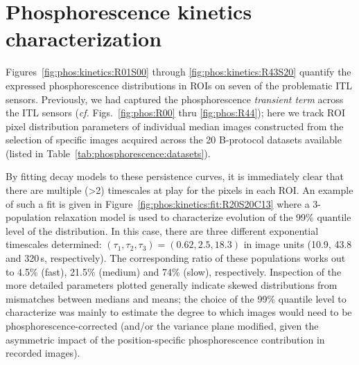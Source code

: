 \section{Phosphorescence kinetics characterization}
\label{appendix:phos:kinetics}

Figures~\ref{fig:phos:kinetics:R01S00} through \ref{fig:phos:kinetics:R43S20} quantify the expressed phosphorescence distributions in ROIs on seven of the problematic ITL sensors. Previously, we had captured the phosphorescence {\it transient term} across the ITL sensors ({\it cf.} Figs.~\ref{fig:phos:R00} thru \ref{fig:phos:R44}); here we track ROI pixel distribution parameters of individual median images constructed from the selection of specific images acquired across the 20 B-protocol datasets available (listed in Table~\ref{tab:phosphorescence:datasets}). 

By fitting decay models to these persistence curves, it is immediately clear that there are multiple (>2) timescales at play for the pixels in each ROI. An example of such a fit is given in Figure~\ref{fig:phos:kinetics:fit:R20S20C13} where a 3-population relaxation model is used to characterize evolution of the 99\% quantile level of the distribution. In this case, there are three different exponential timescales determined: $(\tau_1,\tau_2,\tau_3) = (0.62,2.5,18.3)$ in image units (10.9, 43.8 and 320\,s, respectively). The corresponding ratio of these populations works out to 4.5\% (fast), 21.5\% (medium) and 74\% (slow), respectively. Inspection of the more detailed parameters plotted generally indicate skewed distributions from mismatches between medians and means; the choice of the 99\% quantile level to characterize was mainly to estimate the degree to which images would need to be phosphorescence-corrected (and/or the variance plane modified, given the asymmetric impact of the position-specific phosphorescence contribution in recorded images). 

